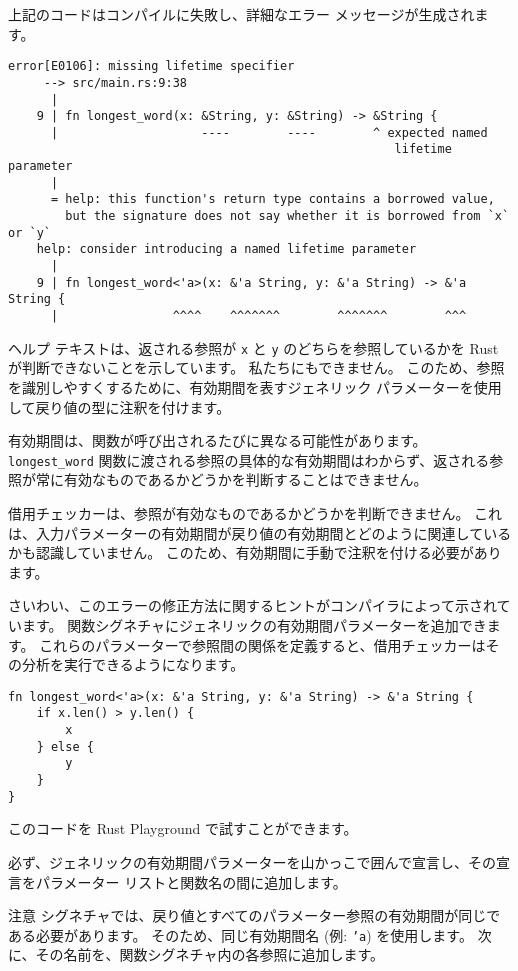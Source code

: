 上記のコードはコンパイルに失敗し、詳細なエラー メッセージが生成されます。

\begin{lstlisting}[numbers=none]
    error[E0106]: missing lifetime specifier
     --> src/main.rs:9:38
      |
    9 | fn longest_word(x: &String, y: &String) -> &String {
      |                    ----        ----        ^ expected named
                                                      lifetime parameter
      |
      = help: this function's return type contains a borrowed value,
        but the signature does not say whether it is borrowed from `x` or `y`
    help: consider introducing a named lifetime parameter
      |
    9 | fn longest_word<'a>(x: &'a String, y: &'a String) -> &'a String {
      |                ^^^^    ^^^^^^^        ^^^^^^^        ^^^
\end{lstlisting}

ヘルプ テキストは、返される参照が \texttt{x} と \texttt{y} のどちらを参照しているかを Rust が判断できないことを示しています。 私たちにもできません。 このため、参照を識別しやすくするために、有効期間を表すジェネリック パラメーターを使用して戻り値の型に注釈を付けます。

有効期間は、関数が呼び出されるたびに異なる可能性があります。 \texttt{longest\_word} 関数に渡される参照の具体的な有効期間はわからず、返される参照が常に有効なものであるかどうかを判断することはできません。

借用チェッカーは、参照が有効なものであるかどうかを判断できません。 これは、入力パラメーターの有効期間が戻り値の有効期間とどのように関連しているかも認識していません。 このため、有効期間に手動で注釈を付ける必要があります。

さいわい、このエラーの修正方法に関するヒントがコンパイラによって示されています。 関数シグネチャにジェネリックの有効期間パラメーターを追加できます。 これらのパラメーターで参照間の関係を定義すると、借用チェッカーはその分析を実行できるようになります。

\begin{lstlisting}[numbers=none]
fn longest_word<'a>(x: &'a String, y: &'a String) -> &'a String {
    if x.len() > y.len() {
        x
    } else {
        y
    }
}
\end{lstlisting}

このコードを Rust Playground で試すことができます。

必ず、ジェネリックの有効期間パラメーターを山かっこで囲んで宣言し、その宣言をパラメーター リストと関数名の間に追加します。

\begin{itembox}[l]{注意}
シグネチャでは、戻り値とすべてのパラメーター参照の有効期間が同じである必要があります。 そのため、同じ有効期間名 (例: \texttt{'a}) を使用します。 次に、その名前を、関数シグネチャ内の各参照に追加します。
\end{itembox}

